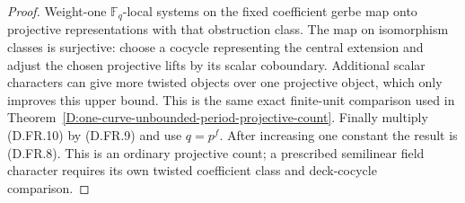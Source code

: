 \begin{proof}
Weight-one $\mathbb F_q$-local systems on the fixed
coefficient gerbe map onto projective representations
with that obstruction class. The map on isomorphism
classes is surjective: choose a cocycle representing
the central extension and adjust the chosen projective
lifts by its scalar coboundary. Additional scalar
characters can give more twisted objects over one
projective object, which only improves this upper
bound. This is the same exact finite-unit comparison
used in Theorem~\ref{D:one-curve-unbounded-period-projective-count}.
Finally multiply (D.FR.10) by (D.FR.9) and use $q=p^f$.
After increasing one constant the result is (D.FR.8).
This is an ordinary projective count; a prescribed
semilinear field character requires its own twisted
coefficient class and deck-cocycle comparison.
\end{proof}
